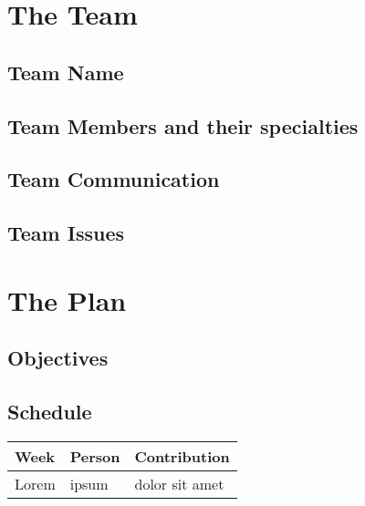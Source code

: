 \documentclass{report}
\begin{document}
\section*{The Team}

\subsection*{Team Name}

\subsection*{Team Members and their specialties}

\subsection*{Team Communication}

\subsection*{Team Issues}

\section*{The Plan}

\subsection*{Objectives}

\subsection*{Schedule}

\begin{tabular}{| l | l | l |}
    \hline
    Week & Person & Contribution \\
    \hline \hline
    Lorem & ipsum & dolor sit amet \\ \hline
\end{tabular}
\end{document}
